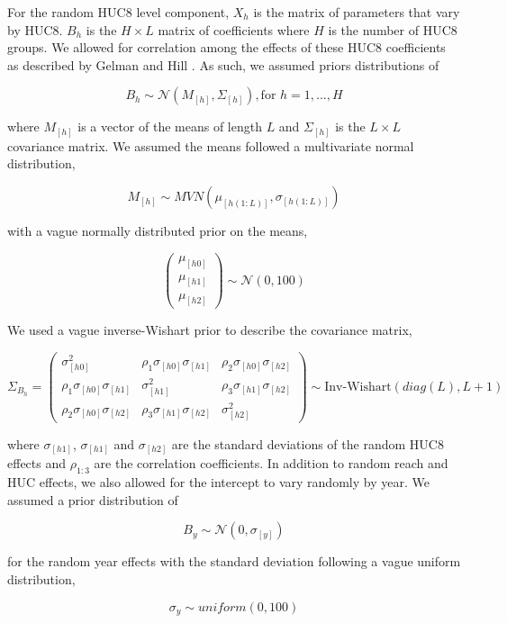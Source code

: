\documentclass[]{article}
\begin{document}
For the random HUC8 level component, \(X_{h}\) is the matrix of
parameters that vary by HUC8. \(B_{h}\) is the \(H \times L\) matrix of
coefficients where \(H\) is the number of HUC8 groups. We allowed for
correlation among the effects of these HUC8 coefficients as described by
Gelman and Hill \citeyearpar{Gelman2007}. As such, we assumed priors
distributions of

\[ B_{h} \sim \mathcal{N}(M_{[h]},\Sigma_{[h]}), \text{for $h = 1,...,H$} \]

where \(M_{[h]}\) is a vector of the means of length \(L\) and
\(\Sigma_{[h]}\) is the \(L \times L\) covariance matrix. We assumed the
means followed a multivariate normal distribution,

\[ M_{[h]} \sim MVN(\mu_{[h(1:L)]}, \sigma_{[h(1:L)]}) \]

with a vague normally distributed prior on the means,

\[ \left( \begin{array}{c} \mu_{[h0]} \\ \mu_{[h1]} \\ \mu_{[h2]} \end{array} \right) \sim \mathcal{N}(0, 100) \]

We used a vague inverse-Wishart prior to describe the covariance matrix,

\[ \Sigma_{B_{h}} = \left( \begin{array}{ccc} \sigma_{[h0]}^2 & \rho_{1}\sigma_{[h0]}\sigma_{[h1]} & \rho_{2}\sigma_{[h0]}\sigma_{[h2]} \\ \rho_{1}\sigma_{[h0]}\sigma_{[h1]} & \sigma_{[h1]}^2 & \rho_{3}\sigma_{[h1]}\sigma_{[h2]} \\ \rho_{2}\sigma_{[h0]}\sigma_{[h2]} & \rho_{3}\sigma_{[h1]}\sigma_{[h2]} & \sigma_{[h2]}^2 \end{array} \right) \sim \text{Inv-Wishart}(diag(L), L+1) \]

where \(\sigma_{[h1]}\), \(\sigma_{[h1]}\) and \(\sigma_{[h2]}\) are the
standard deviations of the random HUC8 effects and \(\rho_{1:3}\) are
the correlation coefficients. In addition to random reach and HUC
effects, we also allowed for the intercept to vary randomly by year. We
assumed a prior distribution of

\[ B_{y} \sim \mathcal{N}(0,\sigma_{[y]}) \]

for the random year effects with the standard deviation following a
vague uniform distribution,

\[ \sigma_{y} \sim uniform(0,100) \]
\end{document}
